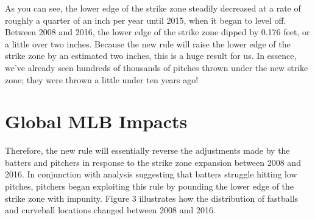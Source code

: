 \documentclass[11pt]{article}
\begin{document}
\begin{figure}[ht]
\begin{floatrow}



\end{floatrow}

\end{figure}
  
As you can see, the lower edge of the strike zone steadily decreased at a rate of roughly a quarter of an inch per year until 2015, when it began to level off.  Between 2008 and 2016, the lower edge of the strike zone dipped by 0.176 feet, or a little over two inches.  Because the new rule will raise the lower edge of the strike zone by an estimated two inches, this is a huge result for us.  In essence, we've already seen hundreds of thousands of pitches thrown under the new strike zone; they were thrown a little under ten years ago!  

\section{Global MLB Impacts}
Therefore, the new rule will essentially reverse the adjustments made by the batters and pitchers in response to the strike zone expansion between 2008 and 2016.  In conjunction with analysis suggesting that batters struggle hitting low pitches, pitchers began exploiting this rule by pounding the lower edge of the strike zone with impunity.  Figure 3 illustrates how the distribution of fastballs and curveball locations changed between 2008 and 2016.
\end{document}

